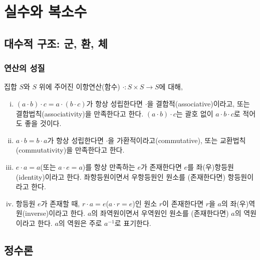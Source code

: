 \part{실수와 복소수}
\chapter{대수적 구조: 군, 환, 체}
\section{연산의 성질}
\begin{definition}
    집합 $S$와 $S$ 위에 주어진 이항연산(함수) $\cdot: S\times S\to S$에 대해, 
    \begin{enumerate}[(i)]
        \item $(a\cdot b)\cdot c=a\cdot(b \cdot c)$가 항상 성립한다면 $\cdot$을 결합적(associative)이라고, 또는 결합법칙(associativity)을 만족한다고 한다. $(a\cdot b)\cdot c$는 괄호 없이 $a\cdot b\cdot c$로 적어도 좋을 것이다. 
        \item $a\cdot b=b\cdot a$가 항상 성립한다면 $\cdot$을 가환적이라고(commutative), 또는 교환법칙(commutativity)을 만족한다고 한다. 
        \item{} $e\cdot a=a$(또는 $a\cdot e=a$)를 항상 만족하는 $e$가 존재한다면 $e$를 좌(우)항등원(identity)이라고 한다. 좌항등원이면서 우항등원인 원소를 (존재한다면) 항등원이라고 한다. 
        \item{} 항등원 $e$가 존재할 때, $r\cdot a=e$($a\cdot r=e$)인 원소 $r$이 존재한다면 $r$을 $a$의 좌(우)역원(inverse)이라고 한다. $a$의 좌역원이면서 우역원인 원소를 (존재한다면) $a$의 역원이라고 한다. $a$의 역원은 주로 $a^{-1}$로 표기한다. 
    \end{enumerate}
\end{definition}
\chapter{정수론}
